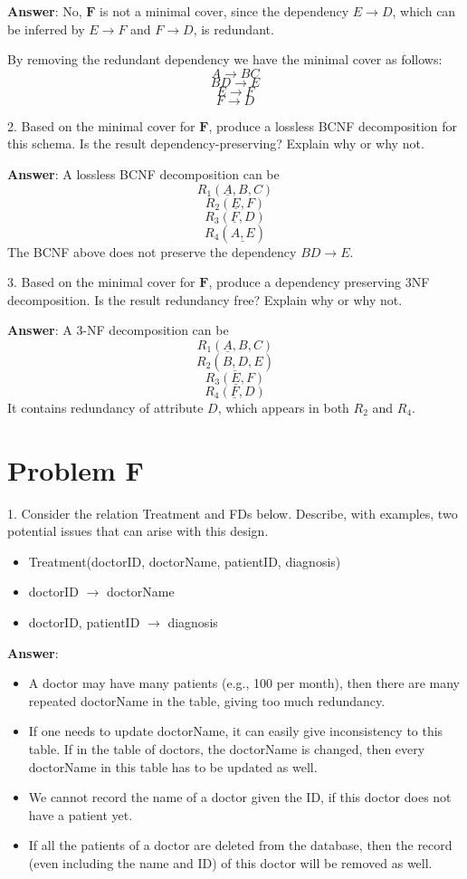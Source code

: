 \documentclass{article}
\begin{document}
{\bf Answer}: No, $\mathbf{F}$ is not a minimal cover, since the dependency $E \to D$, which can be inferred by $E \to F$ and $F \to D$, is redundant.

By removing the redundant dependency we have the minimal cover as follows:
$$A \to BC$$
$$BD \to E$$
$$E \to F$$
$$F \to D$$

2. Based on the minimal cover for $\mathbf{F}$, produce a lossless BCNF decomposition for this schema. Is the result dependency-preserving? Explain why or why not.

{\bf Answer}: A lossless BCNF decomposition can be
$$R_1 (\underline{A}, B, C)$$
$$R_2 (\underline{E}, F)$$
$$R_3 (\underline{F}, D)$$
$$R_4 (\underline{A, E})$$
The BCNF above does not preserve the dependency $BD \to E$.

3. Based on the minimal cover for $\mathbf{F}$, produce a dependency preserving 3NF decomposition. Is the result redundancy free? Explain why or why not.

{\bf Answer}: A 3-NF decomposition can be
$$R_1 (\underline{A}, B, C)$$
$$R_2 (\underline{B, D}, E)$$
$$R_3 (\underline{E}, F)$$
$$R_4 (\underline{F}, D)$$
It contains redundancy of attribute $D$, which appears in both $R_2$ and $R_4$.

\section{Problem F}
1. Consider the relation Treatment and FDs below. Describe, with examples, two potential issues that can arise with this design.
\begin{itemize}
\item Treatment(doctorID, doctorName, patientID, diagnosis)
\item doctorID $\to$ doctorName
\item doctorID, patientID $\to$ diagnosis
\end{itemize}

{\bf Answer}: 
\begin{itemize}
\item A doctor may have many patients (e.g., 100 per month), then there are many repeated doctorName in the table, giving too much redundancy.
\item If one needs to update doctorName, it can easily give inconsistency to this table. If in the table of doctors, the doctorName is changed, then every doctorName in this table has to be updated as well. 
\item We cannot record the name of a doctor given the ID, if this doctor does not have a patient yet.
\item If all the patients of a doctor are deleted from the database, then the record (even including the name and ID) of this doctor will be removed as well.
\end{itemize}
\end{document}
